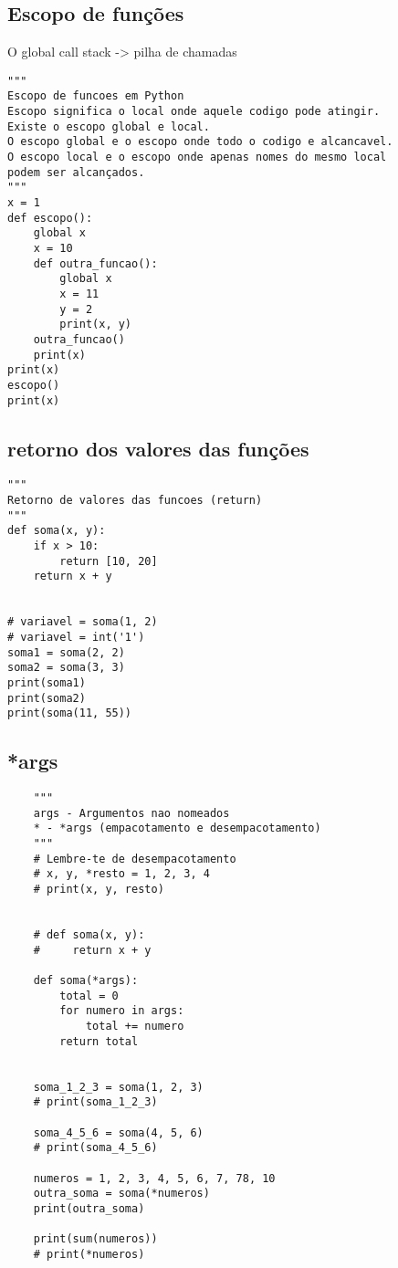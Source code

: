 \documentclass{article}
\begin{document}
\subsection{Escopo de funções}
O global
call stack  ->  pilha de chamadas
\begin{lstlisting}
"""
Escopo de funcoes em Python
Escopo significa o local onde aquele codigo pode atingir.
Existe o escopo global e local.
O escopo global e o escopo onde todo o codigo e alcancavel.
O escopo local e o escopo onde apenas nomes do mesmo local
podem ser alcançados.
"""
x = 1
def escopo():
    global x
    x = 10
    def outra_funcao():
        global x
        x = 11
        y = 2
        print(x, y)
    outra_funcao()
    print(x)
print(x)
escopo()
print(x)
\end{lstlisting}
\subsection{retorno dos valores das funções}
\begin{lstlisting}
"""
Retorno de valores das funcoes (return)
"""
def soma(x, y):
    if x > 10:
        return [10, 20]
    return x + y


# variavel = soma(1, 2)
# variavel = int('1')
soma1 = soma(2, 2)
soma2 = soma(3, 3)
print(soma1)
print(soma2)
print(soma(11, 55))
\end{lstlisting}
\subsection{*args}
\begin{lstlisting}
    """
    args - Argumentos nao nomeados
    * - *args (empacotamento e desempacotamento)
    """
    # Lembre-te de desempacotamento
    # x, y, *resto = 1, 2, 3, 4
    # print(x, y, resto)
    
    
    # def soma(x, y):
    #     return x + y
    
    def soma(*args):
        total = 0
        for numero in args:
            total += numero
        return total
    
    
    soma_1_2_3 = soma(1, 2, 3)
    # print(soma_1_2_3)
    
    soma_4_5_6 = soma(4, 5, 6)
    # print(soma_4_5_6)
    
    numeros = 1, 2, 3, 4, 5, 6, 7, 78, 10
    outra_soma = soma(*numeros)
    print(outra_soma)
    
    print(sum(numeros))
    # print(*numeros)
\end{lstlisting}
\end{document}
